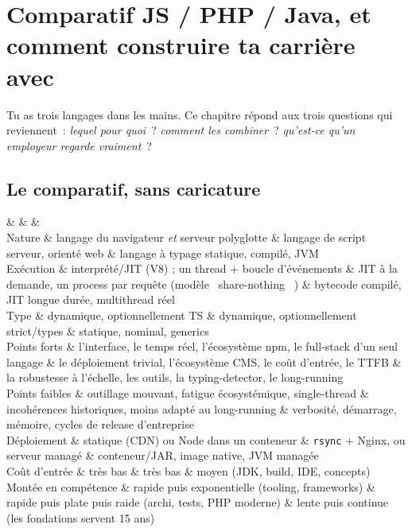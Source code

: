 \chapter{Comparatif JS / PHP / Java, et comment construire ta carri\`ere avec}
\label{ch-cheminement}

Tu as trois langages dans les mains. Ce chapitre r\'epond aux trois questions qui reviennent~:
\emph{lequel pour quoi}~? \emph{comment les combiner}~? \emph{qu'est-ce qu'un employeur regarde
vraiment}~?

\section{Le comparatif, sans caricature}

\begin{tablez}
  \headrow {} \&  \&  \&  \\
  \midrule
  Nature \& langage du navigateur \emph{et} serveur polyglotte \& langage de script serveur, orient\'e web \& langage \`a typage statique, compil\'e, JVM \\
  Ex\'ecution \& interpr\'et\'e/JIT (V8) ; un thread + boucle d'\'ev\'enements \& JIT \`a la demande, un process par requ\^ete (mod\`ele \og ~share-nothing~ \fg{}) \& bytecode compil\'e, JIT longue dur\'ee, multithread r\'eel \\
  Type \& dynamique, optionnellement TS \& dynamique, optionnellement strict/types \& statique, nominal, generics \\
  Points forts \& l'interface, le temps r\'eel, l'\'ecosyst\`eme npm, le full-stack d'un seul langage \& le d\'eploiement trivial, l'\'ecosyst\`eme CMS, le co\^ut d'entr\'ee, le TTFB \& la robustesse \`a l'\'echelle, les outils, la typing-detector, le long-running \\
  Points faibles \& outillage mouvant, fatigue \'ecosyst\'emique, single-thread \& incoh\'erences historiques, moins adapt\'e au long-running \& verbosit\'e, d\'emarrage, m\'emoire, cycles de release d'entreprise \\
  D\'eploiement \& statique (CDN) ou Node dans un conteneur \& \verb|rsync| + Nginx, ou serveur manag\'e \& conteneur/JAR, image native, JVM manag\'ee \\
  Co\^ut d'entr\'ee \& tr\`es bas \& tr\`es bas \& moyen (JDK, build, IDE, concepts) \\
  Mont\'ee en comp\'etence \& rapide puis exponentielle (tooling, frameworks) \& rapide puis plate puis raide (archi, tests, PHP moderne) \& lente puis continue (les fondations servent 15 ans) \\
\end{tablez}

